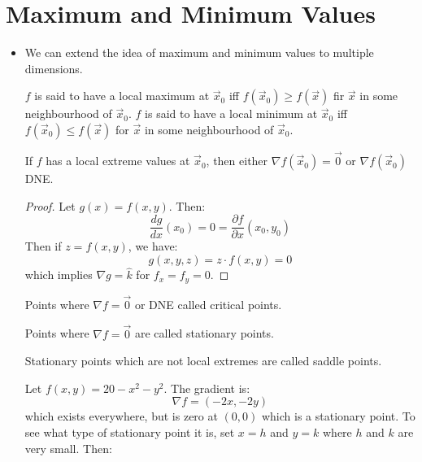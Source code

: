 \section{Maximum and Minimum Values}
\begin{itemize}
    \item We can extend the idea of maximum and minimum values to multiple dimensions.
    \begin{definition}
        $f$ is said to have a local maximum at $\vec{x}_0$ iff $f(\vec{x}_0) \ge f(\vec{x})$ fir $\vec{x}$ in some neighbourhood of $\vec{x}_0$. $f$ is said to have a local minimum at $\vec{x}_0$ iff $f(\vec{x}_0) \le f(\vec{x})$ for $\vec{x}$ in some neighbourhood of $\vec{x}_0$.
    \end{definition}
    \begin{theorem}
        If $f$ has a local extreme values at $\vec{x}_0$, then either $\nabla f(\vec{x}_0) = \vec{0}$ or $\nabla f(\vec{x}_0)$ DNE.
    \end{theorem}
    \begin{proof}
        Let $g(x) = f(x,y)$. Then:
        \begin{equation}
            \frac{dg}{dx}(x_0) = 0 = \frac{\partial f}{\partial x}(x_0, y_0)
        \end{equation}
        Then if $z=f(x,y)$, we have:
        \begin{equation}
            g(x,y,z) = z \cdot f(x,y) = 0
        \end{equation}
        which implies $\nabla g = \hat{k}$ for $f_x=f_y=0$.
    \end{proof}
    \begin{definition}
        Points where $\nabla f = \vec{0}$ or DNE called critical points.
    \end{definition}
    \begin{definition}
        Points where $\nabla f = \vec{0}$ are called stationary points.
    \end{definition}
    \begin{definition}
        Stationary points which are not local extremes are called saddle points.
    \end{definition}
    \begin{definition}
        Let $f(x,y) = 20-x^2-y^2$. The gradient is:
        \begin{equation}
            \nabla f = (-2x, -2y)
        \end{equation}
        which exists everywhere, but is zero at $(0,0)$ which is a stationary point. To see what type of stationary point it is, set $x=h$ and $y=k$ where $h$ and $k$ are very small. Then:

\end{definition}
\end{itemize}
